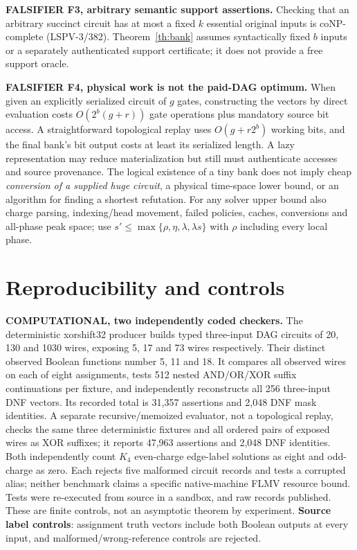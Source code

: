 \documentclass[11pt]{article}
\begin{document}
\noindent\textbf{FALSIFIER F3, arbitrary semantic support assertions.} Checking that an arbitrary succinct circuit has at most a fixed $k$ essential original inputs is coNP-complete (LSPV-3/382). Theorem~\ref{th:bank} assumes syntactically fixed $b$ inputs or a separately authenticated support certificate; it does not provide a free support oracle.

\noindent\textbf{FALSIFIER F4, physical work is not the paid-DAG optimum.} When given an explicitly serialized circuit of $g$ gates, constructing the vectors by direct evaluation costs $O(2^b(g+r))$ gate operations plus mandatory source bit access. A straightforward topological replay uses $O(g+r2^b)$ working bits, and the final bank's bit output costs at least its serialized length. A lazy representation may reduce materialization but still must authenticate accesses and source provenance. The logical existence of a tiny bank does not imply cheap \emph{conversion of a supplied huge circuit}, a physical time-space lower bound, or an algorithm for finding a shortest refutation. For any solver upper bound also charge parsing, indexing/head movement, failed policies, caches, conversions and all-phase peak space; use $s'\le\max\{\rho,\eta,\lambda,\lambda s\}$ with $\rho$ including every local phase.

\section*{Reproducibility and controls}
\noindent\textbf{COMPUTATIONAL, two independently coded checkers.} The deterministic xorshift32 producer builds typed three-input DAG circuits of 20, 130 and 1030 wires, exposing 5, 17 and 73 wires respectively. Their distinct observed Boolean functions number 5, 11 and 18. It compares all observed wires on each of eight assignments, tests 512 nested AND/OR/XOR suffix continuations per fixture, and independently reconstructs all 256 three-input DNF vectors. Its recorded total is 31,357 assertions and 2,048 DNF mask identities. A separate recursive/memoized evaluator, not a topological replay, checks the same three deterministic fixtures and all ordered pairs of exposed wires as XOR suffixes; it reports 47,963 assertions and 2,048 DNF identities. Both independently count $K_4$ even-charge edge-label solutions as eight and odd-charge as zero. Each rejects five malformed circuit records and tests a corrupted alias; neither benchmark claims a specific native-machine FLMV resource bound. Tests were re-executed from source in a sandbox, and raw records published. These are finite controls, not an asymptotic theorem by experiment. \textbf{Source label controls}: assignment truth vectors include both Boolean outputs at every input, and malformed/wrong-reference controls are rejected.
\end{document}
